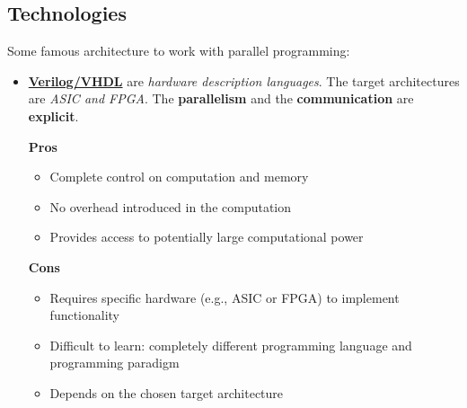 \subsection{Technologies}

Some famous architecture to work with parallel programming:
\begin{itemize}
    \item \textbf{\underline{Verilog/VHDL}} are \emph{hardware description languages}. The target architectures are \emph{ASIC and FPGA}. The \textbf{parallelism} and the \textbf{communication} are \textbf{explicit}.
    \begin{flushleft}
        \textcolor{Green3}{ \textbf{Pros}}
    \end{flushleft}
    \begin{itemize}
        \item Complete control on computation and memory
        \item No overhead introduced in the computation
        \item Provides access to potentially large computational power
    \end{itemize}
    \begin{flushleft}
        \textcolor{Red2}{ \textbf{Cons}}
    \end{flushleft}
    \begin{itemize}
        \item Requires specific hardware (e.g., ASIC or FPGA) to implement functionality
        \item Difficult to learn: completely different programming language and programming paradigm
        \item Depends on the chosen target architecture
    \end{itemize}


\end{itemize}
